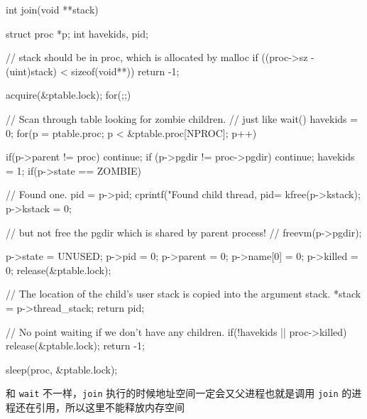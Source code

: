 \begin{ccode}
                    
    int
    join(void **stack) {
        struct proc *p;
        int havekids, pid;
                                
        // stack should be in proc, which is allocated by malloc
        if ((proc->sz - (uint)stack) < sizeof(void**))
        return -1;
                                
        acquire(&ptable.lock);
        for(;;){
            // Scan through table looking for zombie children.
            // just like wait()
            havekids = 0;
            for(p = ptable.proc; p < &ptable.proc[NPROC]; p++){
                if(p->parent != proc)
                continue;
                if (p->pgdir != proc->pgdir)
                continue;
                havekids = 1;
                if(p->state == ZOMBIE){
                    // Found one.
                    pid = p->pid; cprintf("Found child thread, pid=%
                    kfree(p->kstack);
                    p->kstack = 0;
                                                                                
                    // but not free the pgdir which is shared by parent process!
                    // freevm(p->pgdir);
                                                                                
                    p->state = UNUSED;
                    p->pid = 0;
                    p->parent = 0;
                    p->name[0] = 0;
                    p->killed = 0;
                    release(&ptable.lock);
                                                                                
                    // The location of the child's user stack is copied into the argument stack.
                    *stack = p->thread_stack;
                    return pid;
                }
            }
                                                
            // No point waiting if we don't have any children.
            if(!havekids || proc->killed){
                release(&ptable.lock);
                return -1;
            }
                                                
            sleep(proc, &ptable.lock);
        }
    }
\end{ccode}

和 \texttt{wait} 不一样，\texttt{join} 执行的时候地址空间一定会又父进程也就是调用 \texttt{join} 的进程还在引用，所以这里不能释放内存空间

